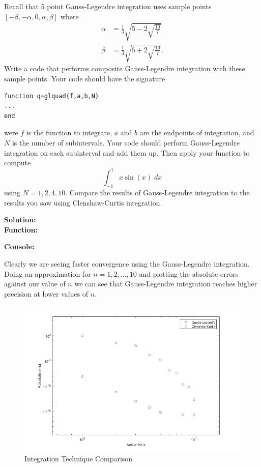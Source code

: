 \documentclass[12pt]{article}
\makeatletter
\theoremstyle{homework}
\newenvironment{exercise}[1]
{\def\@currentlabel{#1}\exercisecore}
{\endexercisecore}
\newcommand{\localhead}[1]{\par\smallskip\noindent\textbf{#1}\nobreak\\}%
\newcommand\solution{\localhead{Solution:}}
\makeatother
\begin{document}
\begin{exercise}{Supplimental 2} Recall that 5 point Gauss-Legendre integration
uses sample points
$[-\beta,-\alpha,0,\alpha,\beta]$ where
\[
\begin{aligned}
\alpha &= \frac{1}{3}\sqrt{5-2\sqrt{\frac{10}{7}}}\\
\beta &= \frac{1}{3}\sqrt{5+2\sqrt{\frac{10}{7}}}.
\end{aligned}
\]
Write a code that performs composite Gauss-Legendre integration
with these sample points.  Your code should have the signature
\begin{verbatim}
function q=glquad(f,a,b,N)
...
end
\end{verbatim}
were $f$ is the function to integrate, $a$ and $b$ are the endpoints
of integration, and $N$ is the number of subintervals. Your code
should perform Gauss-Legendre integration on each subinterval and add them up.
Then apply your function to compute
\[
\int_{-1}^1 x\sin(x)\;dx
\]
using $N=1,2,4,10$.  Compare the results of Gauss-Legendre integration
to the results you saw using Clenshaw-Curtis integration.\\

\solution

\textbf{Function:}
\begin{center}

\end{center}

\textbf{Console:}
\begin{center}

\end{center}
Clearly we are seeing faster convergence using the Gauss-Legendre integration. Doing an approximation for 
$n = 1,2,\dots,10$ and plotting the absolute errors against our value of $n$ we can see that Gauss-Legendre integration
reaches higher precision at lower values of $n$.\\

\begin{figure}[h]
    \caption{Integration Technique Comparison}
    \includegraphics[width = \textwidth]{error analysis.png}  
    \centering
  \end{figure}
\end{exercise}
\vspace{.5in}
\end{document}
